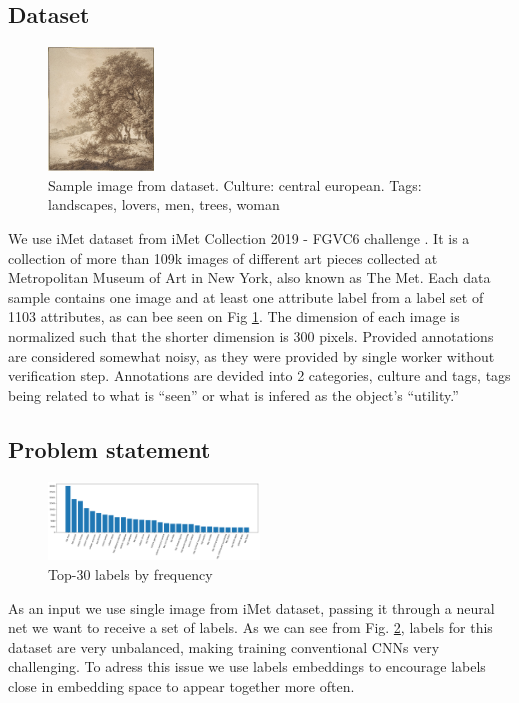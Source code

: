\documentclass[10pt,twocolumn,letterpaper]{article}
\begin{document}
\subsection{Dataset}
\begin{figure}[h!]
\begin{center}
    \includegraphics[width=0.25\textwidth]{sample}
\end{center}
  \caption{Sample image from dataset. Culture: central european. Tags: landscapes, lovers, men, trees, woman}
  \label{fig:imet_sample}
\end{figure}
We use iMet dataset from iMet Collection 2019 - FGVC6 challenge \cite{imet}. It is a collection of more than 109k images of different art pieces collected at Metropolitan Museum of Art in New York, also known as The Met.
Each data sample contains one image and at least one attribute label from a label set of 1103 attributes, as can bee seen on Fig \ref{fig:imet_sample}. The dimension of each image is normalized such that the shorter dimension is 300 pixels. Provided annotations are considered somewhat noisy, as they were provided by single worker without verification step. Annotations are devided into 2 categories, culture and tags, tags being related to what is “seen” or what is infered as the object’s “utility.”	

\subsection{Problem statement}
\begin{figure}[h!]
  \includegraphics[width=0.5\textwidth]{labels_frequency}
  \caption{Top-30 labels by frequency}
  \label{fig:top30}
\end{figure}


As an input we use single image from iMet dataset, passing it through a neural net we want to receive a set of labels.
As we can see from Fig. \ref{fig:top30}, labels for this dataset are very unbalanced, making training conventional CNNs very challenging. To adress this issue we use labels embeddings to encourage labels close in embedding space to appear together more often.
\end{document}
